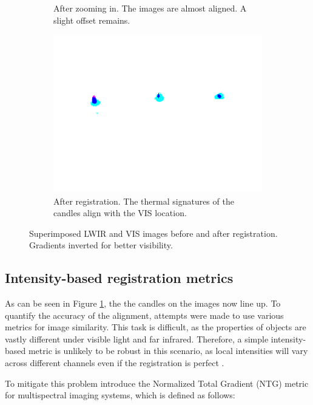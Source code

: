 \documentclass{l4proj}
\begin{document}
\begin{figure}[ht]
\begin{subfigure}[h!]{0.3\textwidth}
    \caption{After zooming in. The images are almost aligned. A slight offset remains.}
  \end{subfigure}
  \begin{subfigure}[h!]{0.3\textwidth}
    \includegraphics[width=\textwidth, trim={3.5cm 9cm 3.5cm 4.5cm}, clip, frame]{images/registration/registered_affine.png}
    \caption{After registration. The thermal signatures of the candles align with the VIS location.}
  \end{subfigure}
  \caption{Superimposed LWIR and VIS images before and after registration. Gradients inverted for better visibility.}
  \label{fig:linear_trans_before_after}
\end{figure}

\subsection{Intensity-based registration metrics}

As can be seen in Figure \ref{fig:linear_trans_before_after}, the the candles on the images now line up. To quantify the accuracy of the alignment, attempts were made to use various metrics for image similarity. This task is difficult, as the properties of objects are vastly different under visible light and far infrared. Therefore, a simple intensity-based metric is unlikely to be robust in this scenario, as local intensities will vary across different channels even if the registration is perfect \citep{myronenko_intensity-based_2010}.

To mitigate this problem \citet{chen_normalized_2018} introduce the Normalized Total Gradient (NTG) metric for multispectral imaging systems, which is defined as follows:
\end{document}
